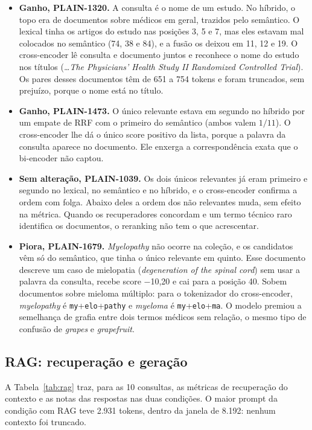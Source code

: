 \documentclass[11pt,a4paper]{article}
\newcommand{\cod}[1]{\texttt{#1}}
\begin{document}
\begin{itemize}
\item \textbf{Ganho, PLAIN-1320.} A consulta é o nome de um estudo. No híbrido, o topo era de documentos sobre médicos em geral, trazidos pelo semântico. O lexical tinha os artigos do estudo nas posições 3, 5 e 7, mas eles estavam mal colocados no semântico (74, 38 e 84), e a fusão os deixou em 11, 12 e 19. O cross-encoder lê consulta e documento juntos e reconhece o nome do estudo nos títulos (\emph{\ldots The Physicians' Health Study II Randomized Controlled Trial}). Os pares desses documentos têm de 651 a 754 tokens e foram truncados, sem prejuízo, porque o nome está no título.
\item \textbf{Ganho, PLAIN-1473.} O único relevante estava em segundo no híbrido por um empate de RRF com o primeiro do semântico (ambos valem $1/11$). O cross-encoder lhe dá o único score positivo da lista, porque a palavra da consulta aparece no documento. Ele enxerga a correspondência exata que o bi-encoder não captou.
\item \textbf{Sem alteração, PLAIN-1039.} Os dois únicos relevantes já eram primeiro e segundo no lexical, no semântico e no híbrido, e o cross-encoder confirma a ordem com folga. Abaixo deles a ordem dos não relevantes muda, sem efeito na métrica. Quando os recuperadores concordam e um termo técnico raro identifica os documentos, o reranking não tem o que acrescentar.
\item \textbf{Piora, PLAIN-1679.} \emph{Myelopathy} não ocorre na coleção, e os candidatos vêm só do semântico, que tinha o único relevante em quinto. Esse documento descreve um caso de mielopatia (\emph{degeneration of the spinal cord}) sem usar a palavra da consulta, recebe score $-$10,20 e cai para a posição 40. Sobem documentos sobre mieloma múltiplo: para o tokenizador do cross-encoder, \emph{myelopathy} é \cod{my}+\cod{elo}+\cod{pathy} e \emph{myeloma} é \cod{my}+\cod{elo}+\cod{ma}. O modelo premiou a semelhança de grafia entre dois termos médicos sem relação, o mesmo tipo de confusão de \emph{grapes} e \emph{grapefruit}.
\end{itemize}

\FloatBarrier
\subsection{RAG: recuperação e geração}
\label{sec:res-rag}

A Tabela~\ref{tab:rag} traz, para as 10 consultas, as métricas de recuperação do contexto e as notas das respostas nas duas condições. O maior prompt da condição com RAG teve 2.931 tokens, dentro da janela de 8.192: nenhum contexto foi truncado.
\end{document}
